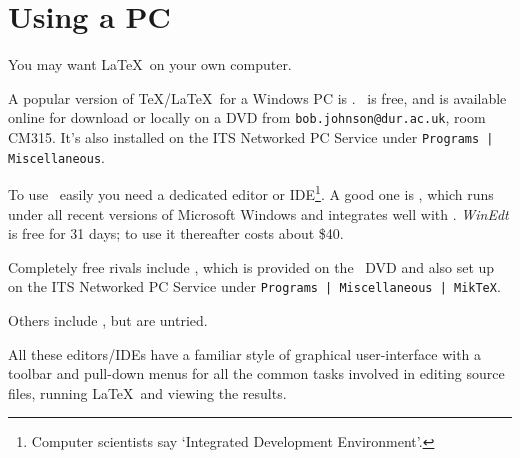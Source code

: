 \chapter{Using a PC}\label{app:pc}
You may want \LaTeX\ on your own computer.
\par
A popular version of \TeX/\LaTeX\ for a Windows PC is 
\cite{MKT}. \miktex\ is free, and is available online for 
download \cite{LAT} or locally on a DVD from
\texttt{bob.johnson@dur.ac.uk}, room CM315. It's also installed on the
ITS Networked PC Service under \texttt{Programs | Miscellaneous}.
\par
To use \miktex\ easily you need a dedicated
editor or IDE\footnote{Computer scientists say \lq Integrated 
Development Environment'.}. A good one is  \cite{WDT}, 
which runs under all recent versions of Microsoft Windows and integrates 
well with \miktex. \textsl{WinEdt} is free for 31 days; to use
it thereafter costs about \$40.
\par 
Completely free rivals include  \cite{TXC}, which is
provided on the \miktex\ DVD and also set up on the ITS Networked PC
Service under \texttt{Programs | Miscellaneous | MikTeX}.
\par
Others include \eg {} \cite{WSH}, but are untried.
\par
All these editors/IDEs have a familiar style of graphical user-interface
with a toolbar and pull-down menus for all the common tasks involved in
editing source files, running \LaTeX\ and viewing the results.
